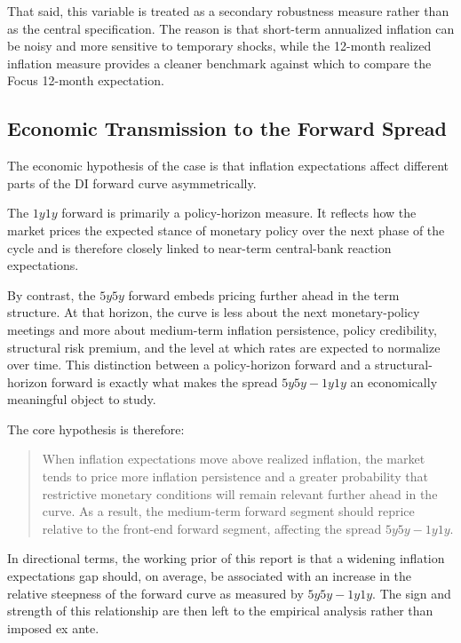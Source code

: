 \documentclass[11pt]{article}
\begin{document}
	That said, this variable is treated as a secondary robustness measure rather than as the central specification. The reason is that short-term annualized inflation can be noisy and more sensitive to temporary shocks, while the 12-month realized inflation measure provides a cleaner benchmark against which to compare the Focus 12-month expectation.
	
	\subsection{Economic Transmission to the Forward Spread}
	\label{subsec:economic_transmission}
	
	The economic hypothesis of the case is that inflation expectations affect different parts of the DI forward curve asymmetrically.
	
	The \(1y1y\) forward is primarily a policy-horizon measure. It reflects how the market prices the expected stance of monetary policy over the next phase of the cycle and is therefore closely linked to near-term central-bank reaction expectations.
	
	By contrast, the \(5y5y\) forward embeds pricing further ahead in the term structure. At that horizon, the curve is less about the next monetary-policy meetings and more about medium-term inflation persistence, policy credibility, structural risk premium, and the level at which rates are expected to normalize over time. This distinction between a policy-horizon forward and a structural-horizon forward is exactly what makes the spread \(5y5y - 1y1y\) an economically meaningful object to study.
	
	The core hypothesis is therefore:
	
	\begin{quote}
		When inflation expectations move above realized inflation, the market tends to price more inflation persistence and a greater probability that restrictive monetary conditions will remain relevant further ahead in the curve. As a result, the medium-term forward segment should reprice relative to the front-end forward segment, affecting the spread \(5y5y - 1y1y\).
	\end{quote}
	
	In directional terms, the working prior of this report is that a widening inflation expectations gap should, on average, be associated with an increase in the relative steepness of the forward curve as measured by \(5y5y - 1y1y\). The sign and strength of this relationship are then left to the empirical analysis rather than imposed ex ante.
	
\end{document}
